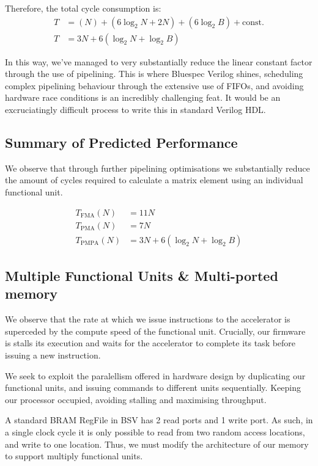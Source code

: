\documentclass[a4paper,8pt]{report}
\begin{document}
Therefore, the total cycle consumption is:
\begin{align*}
  T &= (N) + (6\log_2{N} + 2N) + (6\log_2{B}) + \text{const.} \\
  T &= 3N + 6(\log_2{N} + \log_2{B})
\end{align*}

In this way, we've managed to very substantially reduce the linear constant
factor through the use of pipelining. This is where Bluespec Verilog shines,
scheduling complex pipelining behaviour through the extensive use of FIFOs, and
avoiding hardware race conditions is an incredibly challenging feat. It would be
an excruciatingly difficult process to write this in standard Verilog HDL. 

\subsection{Summary of Predicted Performance}
We observe that through further pipelining optimisations we substantially reduce
the amount of cycles required to calculate a matrix element using an individual
functional unit.  

\begin{align*}
  T_{\text{FMA}}(N) &= 11N \\
  T_{\text{PMA}}(N) &= 7N  \\
  T_{\text{PMPA}}(N) &= 3N + 6(\log_2{N} + \log_2{B})
\end{align*}

\subsection{Multiple Functional Units \& Multi-ported memory}
We observe that the rate at which we issue instructions to the accelerator is
superceded by the compute speed of the functional unit. Crucially, our firmware
is stalls its execution and waits for the accelerator to complete its task
before issuing a new instruction.

We seek to exploit the paralellism offered in hardware design by duplicating our
functional units, and issuing commands to different units sequentially. Keeping
our processor occupied, avoiding stalling and maximising throughput.

A standard BRAM RegFile in BSV has 2 read ports and 1 write port. As such, in a
single clock cycle it is only possible to read from two random access locations,
and write to one location. Thus, we must modify the architecture of our memory
to support multiply functional units.
\end{document}
